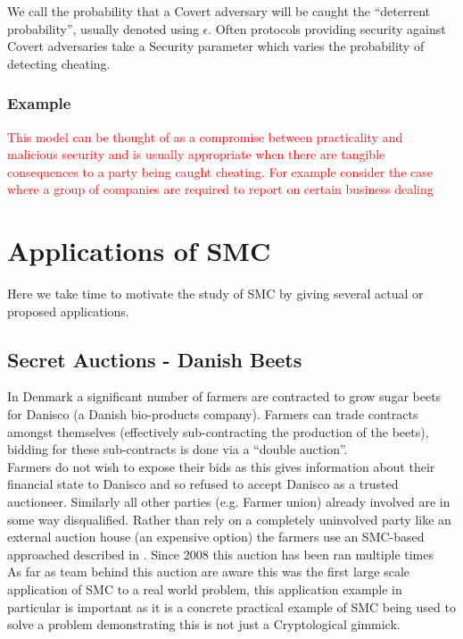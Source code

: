 \documentclass[ %
                    author={Nicholas Tutte},
                supervisor={Prof. Nigel Smart},
                    degree={MEng},
                     title={Secure Two Party Computation},
                  subtitle={A practical comparison of recent protocols},
                      type={Research - GG1K},
                      year={2015} ]{dissertation}
\begin{document}
				We call the probability that a Covert adversary will be caught the ``deterrent probability'', usually denoted using $\epsilon$. Often protocols providing security against Covert adversaries take a Security parameter which varies the probability of detecting cheating.

				\subsubsection{Example} 

				\textcolor{red}{ This model can be thought of as a compromise between practicality and malicious security and is usually appropriate when there are tangible consequences to a party being caught cheating. For example consider the case where a group of companies are required to report on certain business dealing }

		\section{Applications of SMC} \label{sub:Applications}
			Here we take time to motivate the study of SMC by giving several actual or proposed applications.

			\subsection{Secret Auctions - Danish Beets} \label{BeetsAuctionApplication}
				In Denmark a significant number of farmers are contracted to grow sugar beets for Danisco (a Danish bio-products company). Farmers can trade contracts amongst themselves (effectively sub-contracting the production of the beets), bidding for these sub-contracts is done via a ``double auction''.\\

				Farmers do not wish to expose their bids as this gives information about their financial state to Danisco and so refused to accept Danisco as a trusted auctioneer. Similarly all other parties (e.g. Farmer union) already involved are in some way disqualified. Rather than rely on a completely uninvolved party like an external auction house (an expensive option) the farmers use an SMC-based approached described in \cite{SugarBeets}. Since 2008 this auction has been ran multiple times \\

				As far as team behind this auction are aware this was the first large scale application of SMC to a real world problem, this application example in particular is important as it is a concrete practical example of SMC being used to solve a problem demonstrating this is not just a Cryptological gimmick.
\end{document}
